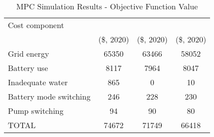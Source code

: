 \begin{table}[!htb]
	\caption{MPC Simulation Results - Objective Function Value}
	\label{table:mpc-simulation-results}
	\centering
	\setlength\tabcolsep{0.6mm}
	\begin{tabular}{lS[table-format=5]S[table-format=5]S[table-format=5]}
		\toprule
		  Cost component
          & {} & {} & {} \\
		  & {(\$, 2020)} & {(\$, 2020)}                    & {(\$, 2020)} \\
		\midrule
		Grid energy            & 65350 & 63466 & 58052 \\
		Battery use            &  8117 &  7964 &  8047 \\
		Inadequate water       &   865 &     0 &    10 \\
		Battery mode switching &   246 &   228 &   230 \\
		Pump switching         &    94 &    90 &    80 \\
		\midrule
		TOTAL                       & 74672 & 71749 & 66418 \\
		\bottomrule
	\end{tabular}
\end{table}

